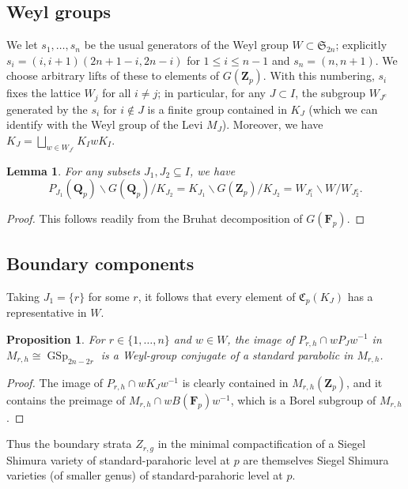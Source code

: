 \documentclass[cjm]{ipart}
\theoremstyle{plain}
\newtheorem{lemma}[theorem]{Lemma}
\newtheorem{proposition}[theorem]{Proposition}
\theoremstyle{remark}
\DeclareMathOperator{\GSp}{GSp}
\newcommand{\Fp}{\mathbf{F}_p}
\newcommand{\QQ}{\mathbf{Q}}
\newcommand{\Qp}{\QQ_p}
\newcommand{\Zp}{\mathbf{Z}_p}
\numberwithin{equation}{subsection}
\renewcommand{\le}{\leqslant}
\begin{document}
 \subsection{Weyl groups}

  We let $s_1, \dots, s_n$ be the usual generators of the Weyl group $W \subset \mathfrak{S}_{2n}$; explicitly $s_i = (i, i+1) (2n+1-i, 2n-i)$ for $1 \le i \le n-1$ and $s_n = (n, n+1)$. We choose arbitrary lifts of these to elements of $G(\Zp)$. With this numbering, $s_i$ fixes the lattice $W_j$ for all $i \ne j$; in particular, for any $J \subset I$, the subgroup $W_{J^c}$ generated by the $s_i$ for $i \notin J$ is a finite group contained in $K_J$ (which we can identify with the Weyl group of the Levi $M_J$). Moreover, we have $K_J = \bigsqcup_{w \in W_{J^c}} K_I w K_I$.

  \begin{lemma}
   For any subsets $J_1, J_2 \subseteq I$, we have
   \[ P_{J_1}(\Qp) \backslash G(\Qp) / K_{J_2} = K_{J_1} \backslash G(\Zp) / K_{J_2} = W_{J_1^c} \backslash W / W_{J_2^c}. \]
  \end{lemma}

  \begin{proof}
   This follows readily from the Bruhat decomposition of $G(\Fp)$.
  \end{proof}

 \subsection{Boundary components}

  Taking $J_1 = \{r\}$ for some $r$, it follows that every element of $\mathfrak{C}_p(K_J)$ has a representative in $W$.

  \begin{proposition}
   For $r \in \{1, \dots, n\}$ and $w \in W$, the image of $P_{r, h} \cap w P_J w^{-1}$ in $M_{r, h} \cong \GSp_{2n-2r}$ is a Weyl-group conjugate of a standard parabolic in $M_{r, h}$.
  \end{proposition}

  \begin{proof}
   The image of $P_{r, h} \cap w K_Jw^{-1}$ is clearly contained in $M_{r, h}(\Zp)$, and it contains the preimage of $M_{r, h} \cap w B(\Fp) w^{-1}$, which is a Borel subgroup of $M_{r, h}$.
  \end{proof}

  Thus the boundary strata $Z_{r, g}$ in the minimal compactification of a Siegel Shimura variety of standard-parahoric level at $p$ are themselves Siegel Shimura varieties (of smaller genus) of standard-parahoric level at $p$.
\end{document}

